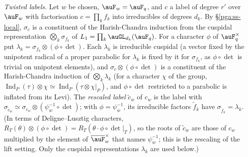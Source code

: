 \documentclass[10pt]{amsart}
\theoremstyle{definition}
\theoremstyle{remark}
\begin{document}
\emph{Twisted labels.} Let $w$ be chosen, $\auF_w=\auF_q$, and $c$ a label of degree $r'$ over
$\auF_w$ with factorisation $c=\prod_kf_k$ into irreducibles of degrees $d_k$. By
\S\ref{pga:ss-local}, $\sigma_c$ is a constituent of the Harish-Chandra induction from the cuspidal
representation $\bigotimes_k\sigma_{f_k}$ of $L_1=\prod_k\auGL_{d_k}(\auF_q)$. For a character $\phi$ of
$\auF_q^\times$ put $\lambda_k=\sigma_{f_k}\otimes(\phi\circ\det)$. Each $\lambda_k$ is irreducible
cuspidal (a vector fixed by the unipotent radical of a proper parabolic for $\lambda_k$ is fixed by it
for $\sigma_{f_k}$, as $\phi\circ\det$ is trivial on unipotent elements), and $\sigma_c\otimes(\phi
\circ\det)$ is a constituent of the Harish-Chandra induction of $\bigotimes_k\lambda_k$ (for a
character $\chi$ of the group, $\operatorname{Ind}_P(\tau)\otimes\chi\simeq\operatorname{Ind}_P(\tau
\otimes\chi|_P)$, and $\phi\circ\det$ restricted to a parabolic is inflated from its Levi). The
\emph{rescaled label} $\tilde c_w$ of $c_w$ is the label with $\sigma_{\tilde c_w}\simeq\sigma_{c_w}
\otimes(\psi_w^{-1}\circ\det)$; with $\phi=\psi_w^{-1}$, its irreducible factors $\tilde f_k$ have
$\sigma_{\tilde f_k}=\lambda_k$. (In terms of Deligne--Lusztig characters, $R_T(\theta)\otimes(\phi\circ
\det)=R_T(\theta\cdot\phi\circ\det|_T)$, so the roots of $\tilde c_w$ are those of $c_w$ multiplied by the
element of $\overline{\auF}_w^\times$ that names $\psi_w^{-1}$; this is the rescaling of the lift setting.
Only the cuspidal representations $\lambda_k$ are used below.)
\end{document}
